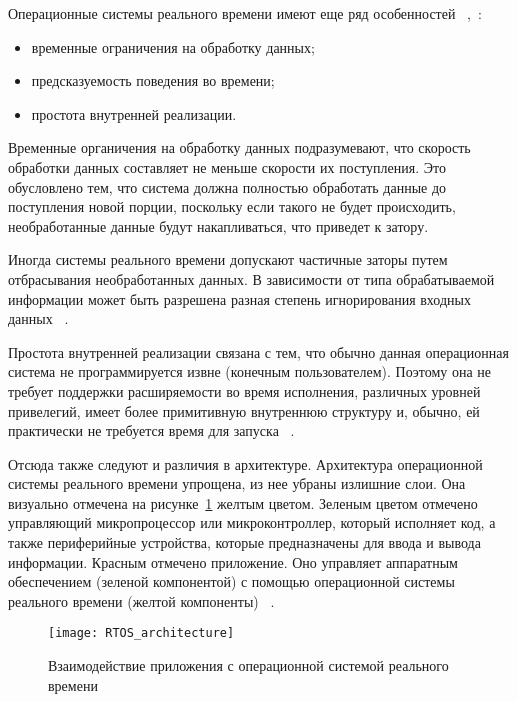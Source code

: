 Операционные системы реального времени имеют еще ряд особенностей
~\cite{tanenbaum_modern_os_2015_ru},~\cite{rtos_valvano}:
\begin{itemize}
    \item временные ограничения на обработку данных;
    \item предсказуемость поведения во времени;
    \item простота внутренней реализации.
\end{itemize}

Временные органичения на обработку данных подразумевают, что скорость обработки
данных составляет не меньше скорости их поступления. Это обусловлено тем, что
система должна полностью обработать данные до поступления новой порции, поскольку
если такого не будет происходить, необработанные данные будут накапливаться,
что приведет к затору.

Иногда системы реального времени допускают частичные заторы путем отбрасывания
необработанных данных. В зависимости от типа обрабатываемой информации
может быть разрешена разная степень игнорирования входных данных
~\cite{tanenbaum_modern_os_2015_ru}.

Простота внутренней реализации связана с тем, что обычно данная
операционная система не программируется извне (конечным пользователем).
Поэтому она не требует поддержки расширяемости во время исполнения,
различных уровней привелегий, имеет более примитивную внутреннюю структуру
и, обычно, ей практически не требуется время для запуска ~\cite{rtos_valvano}.

Отсюда также следуют и различия в архитектуре. Архитектура операционной системы
реального времени упрощена, из нее убраны излишние слои.
Она визуально отмечена на рисунке~\ref{pic:lit_review:rtos_arch} желтым цветом.
Зеленым цветом отмечено управляющий микропроцессор или микроконтроллер, который
исполняет код, а также периферийные устройства, которые предназначены
для ввода и вывода информации. Красным отмечено приложение. Оно
управляет аппаратным обеспечением (зеленой компонентой) с помощью операционной
системы реального времени (желтой компоненты) ~\cite{rtos_arch_site}.

\begin{figure}
    \centering
    \texttt{[image: RTOS\_architecture]}
    \caption{Взаимодействие приложения с операционной системой реального времени}
    \label{pic:lit_review:rtos_arch}

\end{figure}

